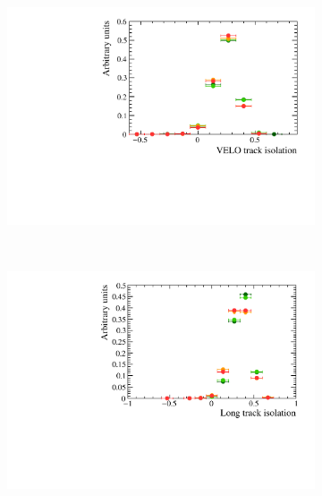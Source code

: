 \begin{figure}
 \begin{subfigure}[b]{0.48\textwidth}
        \includegraphics[width=\textwidth]{./Figs/Appendix1/bkgnd_iso_velo.pdf}
    \end{subfigure}
    ~ %
    \begin{subfigure}[b]{0.48\textwidth}
       \includegraphics[width=\textwidth]{./Figs/Appendix1/bkgnd_long_iso.pdf}
    \end{subfigure}





\end{figure}
